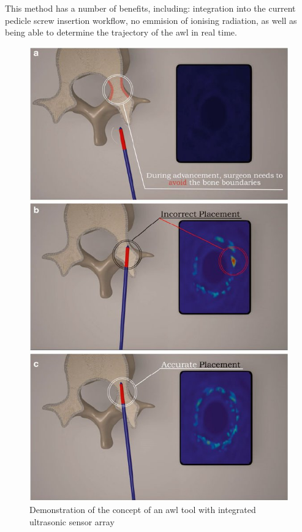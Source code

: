 \documentclass[conference, a4paper]{IEEEtran}
\begin{document}
This method has a number
of benefits, including: integration into the current pedicle screw insertion
workflow, no emmision of ionising radiation, as well as being able to determine
the trajectory of the awl in real time.

\begin{figure}[h!]
	\centering
	\includegraphics{assets/ultraArray.jpg}
	\caption{Demonstration of the concept of an awl tool with integrated ultrasonic sensor array\cite{Manbachi2016}}
	\label{fig:ultraArray}
\end{figure}
\end{document}
